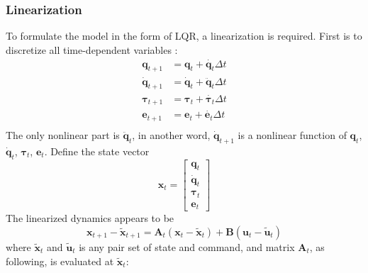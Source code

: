 \subsubsection{Linearization}
To formulate the model in the form of LQR, a linearization is required. First is to discretize all time-dependent variables :
\begin{equation}
\begin{split}
\bm{q}_{t+1} &= \bm{q}_{t} + \dot{\bm{q}_{t}} \Delta t \\
\dot{\bm{q}}_{t+1} &= \dot{\bm{q}}_{t} + \ddot{\bm{q}}_{t} \Delta t \\
\bm{\tau}_{t+1} &= \bm{\tau}_{t} + \dot{\bm{\tau}_{t}} \Delta t \\
\bm{e}_{t+1} &= \bm{e}_{t} + \dot{\bm{e}_{t}} \Delta t \\
\end{split}
\end{equation}
The only nonlinear part is $\ddot{\bm{q}}_t$, in another word, $\dot{\bm{q}}_{t+1}$ is a nonlinear function of $\bm{q}_t$, $\dot{\bm{q}}_t$, ${\bm{\tau}}_t$, ${\bm{e}}_t$. Define the state vector 
\begin{equation}
\bm{x}_t=\left[ \begin{matrix}\bm{q}_t \\ \dot{\bm{q}}_t \\ \bm{\tau}_t \\ \bm{e}_t \end{matrix} \right]
\end{equation}
The linearized dynamics appears to be
\begin{equation}
\bm{x}_{t+1} - \tilde{\bm{x}}_{t+1} = \bm{A}_t (\bm{x}_t - \tilde{\bm{x}}_{t}) + \bm{B}(\bm{u}_t - \tilde{\bm{u}}_t)
\end{equation}
where $\tilde{\bm{x}}_t$ and $\tilde{\bm{u}}_t$ is any pair set of state and command, and matrix $\bm{A}_t$, as following, is evaluated at $\tilde{\bm{x}}_t$:
